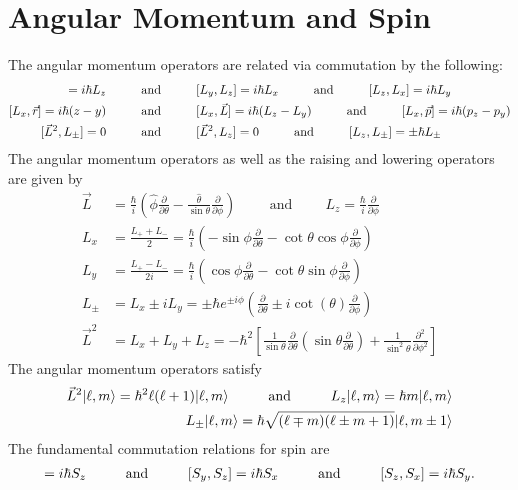 \section{Angular Momentum and Spin}
The angular momentum operators are related via commutation by the following:
\begin{align}
	[L_x,L_y]=i\hbar L_z \andspace{1cm} &[L_y,L_z]=i\hbar L_x \andspace{1cm} [L_z,L_x]=i\hbar L_y \\
	[L_x,\vec{r}]=i\hbar (z-y) \andspace{1cm} &[L_x,\vec{L}] = i\hbar (L_z-L_y) \andspace{1cm} [L_x,\vec{p}] = i\hbar(p_z-p_y) \\
	[\vec{L}^2,L_\pm]=0 \andspace{1cm}&[\vec{L}^2,L_z] = 0 \andspace{1cm} [L_z,L_\pm]=\pm \hbar L_\pm
\end{align}
The angular momentum operators as well as the raising and lowering operators are given by
\begin{align}
	\vec{L} &= \frac{\hbar}{i}\left(\hat{\phi}\frac{\partial}{\partial \theta}- \frac{\hat{\theta}}{\sin \theta}\frac{\partial}{\partial \phi}\right) \hspace{1cm} \textrm{and} \hspace{1cm} L_z =\frac{\hbar}{i} \frac{\partial}{\partial \phi}\\
	L_x &= \frac{L_++L_-}{2}= \frac{\hbar}{i}\left(-\sin\phi \frac{\partial}{\partial \theta}-\cot\theta \cos \phi \frac{\partial}{\partial \phi}\right) \\  L_y &= \frac{L_+-L_-}{2i}= \frac{\hbar}{i}\left(\cos\phi \frac{\partial}{\partial \theta}-\cot\theta \sin \phi \frac{\partial}{\partial \phi}\right) \\
	L_{\pm} &= L_x\pm i L_y = \pm \hbar e^{\pm i \phi} \left(\frac{\partial}{\partial \theta}\pm  i \cot(\theta)\frac{\partial}{\partial \phi}\right) \\
	\vec{L}^2 &= L_x+L_y+L_z =-\hbar^2 \left[\frac{1}{\sin\theta}\frac{\partial}{\partial \theta}\left(\sin\theta\frac{\partial }{\partial \theta}\right)+\frac{1}{\sin^2\theta}\frac{\partial^2}{\partial \phi^2}\right]
\end{align}
The angular momentum operators satisfy
\begin{align}
	\vec{L}^2 | \ell, m \rangle = \hbar^2\ell(\ell+1)| \ell, m \rangle \andspace{1cm} L_z| \ell, m \rangle = \hbar m | \ell, m \rangle \\
	L_{\pm} | \ell, m \rangle = \hbar \sqrt{(\ell \mp m)(\ell \pm m +1)} | \ell, m \pm 1 \rangle
\end{align}
The fundamental commutation relations for spin are
\begin{align}
[S_x,S_y]=i\hbar S_z \andspace{1cm} [S_y,S_z]=i\hbar S_x \andspace{1cm} [S_z,S_x]=i\hbar S_y.
\end{align}
